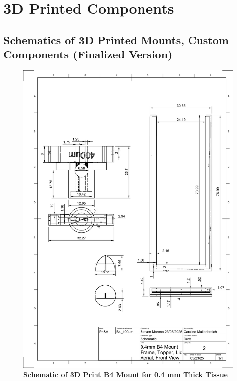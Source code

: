 \chapter{3D Printed Components}

\section{Schematics of 3D Printed Mounts, Custom Components (Finalized Version)}

\newpage
    \begin{figure}[H]
        \centering
        \includegraphics[width=1\linewidth]{Figures/0.4mm B4 Schematic v1.pdf}
        \caption{\textbf{Schematic of 3D Print B4 Mount for 0.4 mm Thick Tissue}}
        \label{fig:enter-label}
    \end{figure}
    
